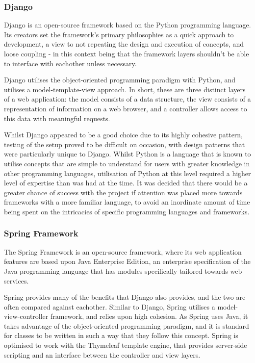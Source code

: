 \subsubsection{Django}

Django is an open-source framework based on the Python programming language. Its creators set the framework's primary philosophies as a quick approach to development, a view to not repeating the design and execution of concepts, and loose coupling - in this context being that the framework layers shouldn't be able to interface with eachother unless necessary.

Django utilises the object-oriented programming paradigm with Python, and utilises a model-template-view approach. In short, these are three distinct layers of a web application: the model consists of a data structure, the view consists of a representation of information on a web browser, and a controller allows access to this data with meaningful requests.

Whilst Django appeared to be a good choice due to its highly cohesive pattern, testing of the setup proved to be difficult on occasion, with design patterns that were particularly unique to Django. Whilst Python is a language that is known to utilise concepts that are simple to understand for users with greater knowledge in other programming languages, utilisation of Python at this level required a higher level of expertise than was had at the time. It was decided that there would be a greater chance of success with the project if attention was placed more towards frameworks with a more familiar language, to avoid an inordinate amount of time being spent on the intricacies of specific programming languages and frameworks.
 
\subsubsection{Spring Framework}

The Spring Framework is an open-source framework, where its web application features are based upon Java Enterprise Edition, an enterprise specification of the Java programming language that has modules specifically tailored towards web services.

Spring provides many of the benefits that Django also provides, and the two are often compared against eachother. Similar to Django, Spring utilises a model-view-controller framework, and relies upon high cohesion. As Spring uses Java, it takes advantage of the object-oriented programming paradigm, and it is standard for classes to be written in such a way that they follow this concept. Spring is optimised to work with the Thymeleaf template engine, that provides server-side scripting and an interface between the controller and view layers.

